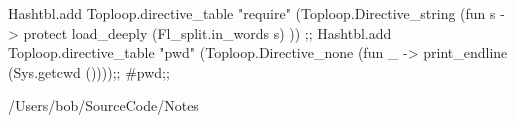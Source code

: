 \begin{enumerate}
\begin{itemize}
    

\begin{ocamlcode}
Hashtbl.add
    Toploop.directive_table
    "require"
    (Toploop.Directive_string
       (fun s ->
	  protect load_deeply (Fl_split.in_words s)
       ))
;;
Hashtbl.add Toploop.directive_table "pwd"
(Toploop.Directive_none (fun _ -> 
  print_endline (Sys.getcwd ())));;
#pwd;;
\end{ocamlcode}

\begin{ocamlcode}
/Users/bob/SourceCode/Notes
\end{ocamlcode}



  \end{itemize}
\end{enumerate}



